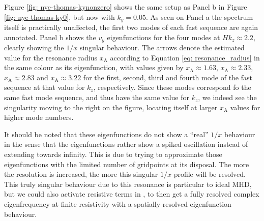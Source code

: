 Figure \ref{fig: nye-thomas-kynonzero} shows the same setup as Panel b in Figure \ref{fig: nye-thomas-ky0}, but now with $k_y = 0.05$. As seen on Panel a the spectrum itself is practically unaffected, the first two modes of each fast sequence are again annotated. Panel b shows the $v_y$ eigenfunctions for the four modes at $H k_z \approx 2.2$, clearly showing the $1/x$ singular behaviour. The arrows denote the estimated value for the resonance radius $x_\text{A}$ according to Equation \eqref{eq: resonance_radius} in the same colour as its eigenfunction, with values given by $x_\text{A} \approx 1.63$, $x_\text{A} \approx 2.33$, $x_\text{A} \approx 2.83$ and $x_\text{A} \approx 3.22$ for the first, second, third and fourth mode of the fast sequence at that value for $k_z$, respectively. Since these modes correspond fo the same fast mode sequence, and thus have the same value for $k_z$, we indeed see the singularity moving to the right on the figure, locating itself at larger $x_\text{A}$ values for higher mode numbers.

It should be noted that these eigenfunctions do not show a ``real'' $1/x$ behaviour in the sense that the eigenfunctions rather show a spiked oscillation instead of extending towards infinity. This is due to {\legolas} trying to approximate those eigenfunctions with the limited number of gridpoints at its disposal. The more the resolution is increased, the more this singular $1/x$ profile will be resolved. This truly singular behaviour due to this resonance is particular to ideal MHD, but we could also activate resistive terms in {\legolas}, to then get a fully resolved complex eigenfrequency at finite resistivity with a spatially resolved eigenfunction behaviour.


